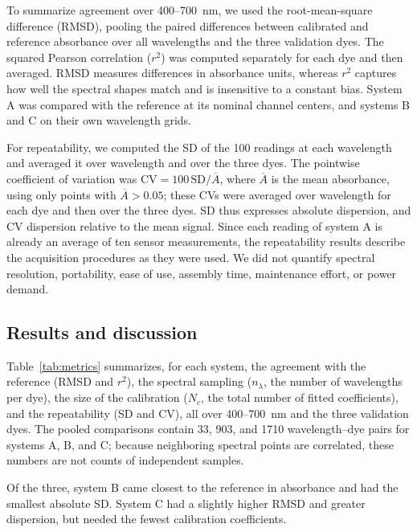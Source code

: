 To summarize agreement over 400--700~nm, we used the root-mean-square difference (RMSD), pooling the paired differences between calibrated and reference absorbance over all wavelengths and the three validation dyes. The squared Pearson correlation ($r^2$) was computed separately for each dye and then averaged. RMSD measures differences in absorbance units, whereas $r^2$ captures how well the spectral shapes match and is insensitive to a constant bias. System A was compared with the reference at its nominal channel centers, and systems B and C on their own wavelength grids.

For repeatability, we computed the SD of the 100 readings at each wavelength and averaged it over wavelength and over the three dyes. The pointwise coefficient of variation was $\mathrm{CV}=100\,\mathrm{SD}/\overline{A}$, where $\overline{A}$ is the mean absorbance, using only points with $\overline{A}>0.05$; these CVs were averaged over wavelength for each dye and then over the three dyes. SD thus expresses absolute dispersion, and CV dispersion relative to the mean signal. Since each reading of system A is already an average of ten sensor measurements, the repeatability results describe the acquisition procedures as they were used. We did not quantify spectral resolution, portability, ease of use, assembly time, maintenance effort, or power demand.
\FloatBarrier

\subsection{Results and discussion}\label{sec4}

Table~\ref{tab:metrics} summarizes, for each system, the agreement with the reference (RMSD and $r^2$), the spectral sampling ($n_\lambda$, the number of wavelengths per dye), the size of the calibration ($N_c$, the total number of fitted coefficients), and the repeatability (SD and CV), all over 400--700~nm and the three validation dyes. The pooled comparisons contain 33, 903, and 1710 wavelength--dye pairs for systems A, B, and C; because neighboring spectral points are correlated, these numbers are not counts of independent samples.

Of the three, system B came closest to the reference in absorbance and had the smallest absolute SD. System C had a slightly higher RMSD and greater dispersion, but needed the fewest calibration coefficients.

